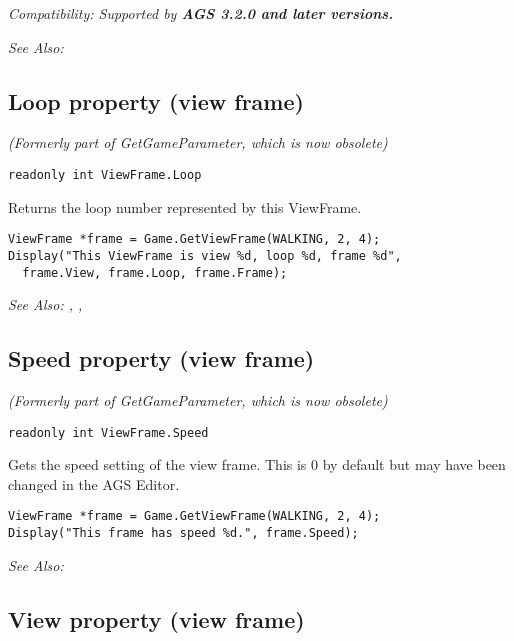 \it{Compatibility:} Supported by \bf{AGS 3.2.0} and later versions.

\it{See Also:} 


\subsection{Loop property (view frame)}\label{ViewFrame.Loop}%

\it{(Formerly part of GetGameParameter, which is now obsolete)}

\begin{verbatim}
readonly int ViewFrame.Loop
\end{verbatim}
Returns the loop number represented by this ViewFrame.

\begin{verbatim}
ViewFrame *frame = Game.GetViewFrame(WALKING, 2, 4);
Display("This ViewFrame is view %d, loop %d, frame %d",
  frame.View, frame.Loop, frame.Frame);
\end{verbatim}

\it{See Also:} ,
,


\subsection{Speed property (view frame)}\label{ViewFrame.Speed}%

\it{(Formerly part of GetGameParameter, which is now obsolete)}

\begin{verbatim}
readonly int ViewFrame.Speed
\end{verbatim}
Gets the speed setting of the view frame. This is 0 by default but may have been changed
in the AGS Editor.

\begin{verbatim}
ViewFrame *frame = Game.GetViewFrame(WALKING, 2, 4);
Display("This frame has speed %d.", frame.Speed);
\end{verbatim}

\it{See Also:} 


\subsection{View property (view frame)}\label{ViewFrame.View}%


